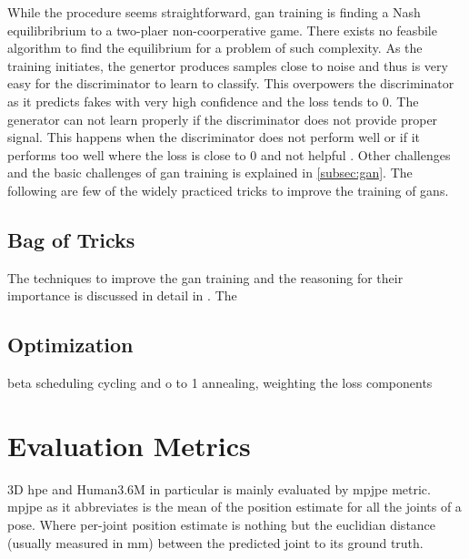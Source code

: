 While the procedure seems straightforward, \ac{gan} training is finding a Nash equilibribrium to a two-plaer non-coorperative game. There exists no feasbile algorithm to find the equilibrium for a problem of such complexity\cite{improved_gan}. As the training initiates, the genertor produces samples close to noise and thus is very easy for the discriminator to learn to classify. This overpowers the discriminator as it predicts fakes with very high confidence and the loss tends to 0. The generator can not learn properly if the discriminator does not provide proper signal. This happens when the discriminator does not perform well or if it performs too well where the loss is close to 0 and not helpful \cite{gan_wgan_tutorial}. Other challenges and the basic challenges of \ac{gan} training is explained in \ref{subsec:gan}. The following are few of the widely practiced tricks to improve the training of \acp{gan}.


\subsection{Bag of Tricks}
The techniques to improve the \ac{gan} training and the reasoning for their importance is discussed in detail in \cite{soumith2017wasserstein,goodfellow2014generative,openaigan2wgan,improved_gan}. The    






\subsection{Optimization}
beta scheduling cycling and o to 1 annealing, weighting the loss components 

\section{Evaluation Metrics} %
3D \ac{hpe} and Human3.6M in particular is mainly evaluated by \ac{mpjpe} metric. \ac{mpjpe} as it abbreviates is the mean of the position estimate for all the joints of a pose. Where per-joint position estimate is nothing but the euclidian distance (usually measured in mm) between the predicted joint to its ground truth.




